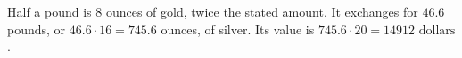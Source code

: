 Half a pound is 8 ounces of gold, twice the stated amount. It exchanges for $46.6$ pounds, or $46.6\cdot16=745.6$ ounces, of silver. Its value is $745.6\cdot20=\boxed{14912\text{ dollars}}$.
